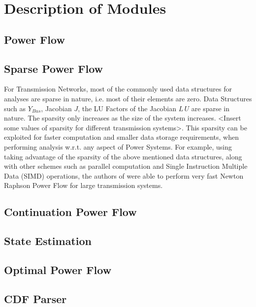 \documentclass[varwidth]{standalone}
\providecommand{\powerflow}[1]{Power Flow}
\providecommand{\sparse}[1]{Sparse Power Flow}
\providecommand{\cpf}[1]{Continuation Power Flow}
\providecommand{\se}[1]{State Estimation}
\providecommand{\opf}[1]{Optimal Power Flow}
\begin{document}
\section{Description of Modules}

\subsection{\powerflow{}}

\subsection{\sparse{}}
    For Transmission Networks, most of the commonly used data structures for analyses are sparse in nature, i.e. most of their elements are zero. Data Structures such as $Y_{Bus}$, Jacobian $J$, the LU Factors of the Jacobian $L \, U$ are sparse in nature. The sparsity only increases as the size of the system increases. <Insert some values of sparsity for different transmission systems>. This sparsity can be exploited for faster computation and smaller data storage requirements, when performing analysis w.r.t. any aspect of Power Systems. For example, using taking advantage of the sparsity of the above mentioned data structures, along with other schemes such as parallel computation and Single Instruction Multiple Data (SIMD) operations, the authors of \cite{Ahmadi2021Sep} were able to perform very fast Newton Raphson Power Flow for large transmission systems.

\subsection{\cpf{}}

\subsection{\se{}}

\subsection{\opf{}}

\subsection{CDF Parser}
\end{document}
